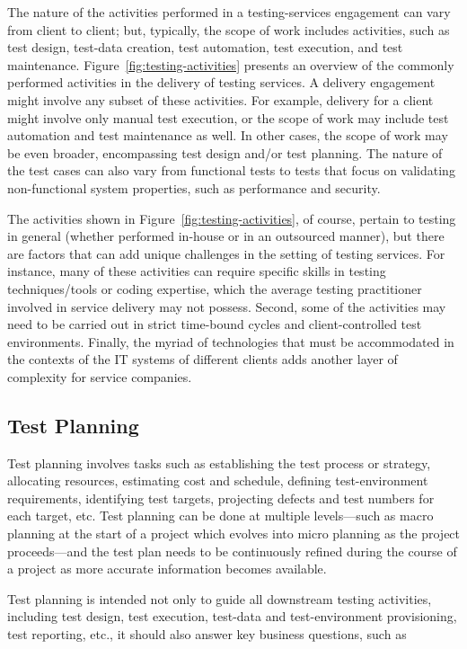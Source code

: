 The nature of the activities performed in a testing-services engagement can vary
from client to client; but, typically, the scope of work includes activities,
such as test design, test-data creation, test automation, test execution, and
test maintenance. Figure~\ref{fig:testing-activities} presents an overview of
the commonly performed activities in the delivery of testing services. A
delivery engagement might involve any subset of these activities. For example,
delivery for a client might involve only manual test execution, or the scope of
work may include test automation and test maintenance as well. In other cases,
the scope of work may be even broader, encompassing test design and/or test
planning. The nature of the test cases can also vary from functional tests to
tests that focus on validating non-functional system properties, such as
performance and security.

The activities shown in Figure~\ref{fig:testing-activities}, of course, pertain
to testing in general (whether performed in-house or in an outsourced manner),
but there are factors that can add unique challenges in the setting of testing
services. For instance, many of these activities can require specific skills in
testing techniques/tools or coding expertise, which the average testing
practitioner involved in service delivery may not possess. Second, some of the
activities may need to be carried out in strict time-bound cycles and
client-controlled test environments. Finally, the myriad of technologies that
must be accommodated in the contexts of the IT systems of different clients adds
another layer of complexity for service companies.

\subsection{Test Planning}
\label{sec:test-planning}

Test planning involves tasks such as establishing the test process or strategy,
allocating resources, estimating cost and schedule, defining test-environment
requirements, identifying test targets, projecting defects and test numbers for
each target, etc.  Test planning can be done at multiple levels---such as macro
planning at the start of a project which evolves into micro planning as the
project proceeds---and the test plan needs to be continuously refined during the
course of a project as more accurate information becomes available.

Test planning is intended not only to guide all downstream testing activities,
including test design, test execution, test-data and test-environment
provisioning, test reporting, etc., it should also answer key business
questions, such as~\cite{Kagan:NextGenTesting}

